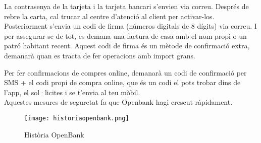 La contrasenya de la tarjeta i la tarjeta bancari s'envien via correu. Després de rebre la carta, cal trucar al centre d'atenció al client per activar-los. Posteriorment s'envia un codi de firma (números digitals de 8 dígits) via correu. I per assegurar-se de tot, es demana una factura de casa amb el nom propi o un patró habitant recent. Aquest codi de firma és un mètode de confirmació extra, demanarà quan es tracta de fer operacions amb import grans.

Per fer confirmacions de compres online, demanarà un codi de confirmació per SMS + el codi propi de compra online, que és un codi el pots trobar dins de l'app, el sol·licites i se t'envia al teu mòbil. \\

Aquestes mesures de seguretat fa que Openbank hagi crescut ràpidament.

\begin{figure}[h]
    \centering
    \texttt{[image: historiaopenbank.png]}
    \caption{Història OpenBank}
\end{figure}  


